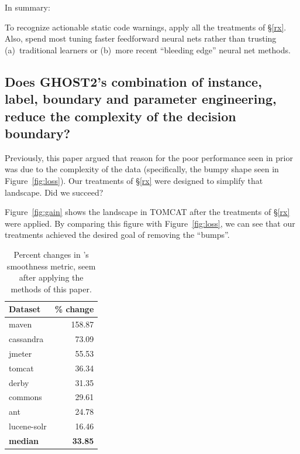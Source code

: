 In summary:
\begin{formal}
 To recognize actionable static code warnings, apply all the treatments of \S\ref{rx}. Also, 
spend most tuning faster feedforward neural nets  rather than trusting (a)~traditional learners or (b)~more recent
``bleeding edge'' neural net methods.
\end{formal}



  
 
\subsection*{ Does GHOST2's combination of instance, label, boundary
and parameter engineering, reduce the complexity of the
decision boundary?}

Previously, this paper argued
that reason for the poor performance
seen in prior was due to the complexity
of the data (specifically, the bumpy shape seen in  Figure~\ref{fig:loss}).
Our treatments of \S\ref{rx} were  designed to simplify that landscape. Did we succeed?

 Figure~\ref{fig:gain}
 shows the landscape in  TOMCAT after
 the   treatments of \S\ref{rx}
 were applied.
 By comparing this figure with
      Figure~\ref{fig:loss},
      we can see that our treatments
      achieved the desired goal
      of removing the ``bumps''.
      
 
 \begin{table}
     
    \caption{Percent changes in \citet{li2018visualizing}'s
    smoothness metric, seem after applying the methods of this paper.}
    \label{tab:fuzzy}
    \begin{tabular}{lr}
        \toprule
        \textbf{Dataset} & \textbf{\% change} \\
        \midrule
        
   \rowcolor{gray!15}       maven & 158.87 \\
        
        cassandra & 73.09 \\
        
        \rowcolor{gray!15}       jmeter & 55.53 \\
        tomcat & 36.34 \\
        \rowcolor{gray!15}       derby & 31.35 \\
        commons & 29.61 \\
         \rowcolor{gray!15}      ant & 24.78 \\
        lucene-solr & 16.46 \\
        \midrule
        \textbf{median} & \textbf{33.85} \\
        \bottomrule
    \end{tabular}
\end{table}

